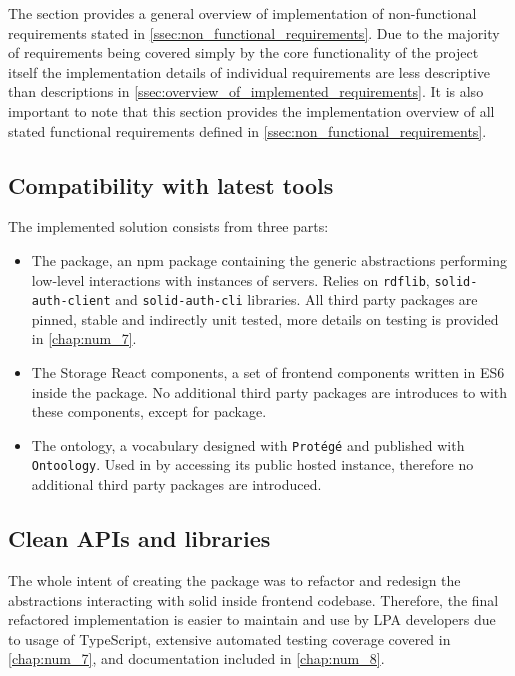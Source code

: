 The section provides a general overview of implementation of non-functional requirements stated in \autoref{ssec:non_functional_requirements}. Due to the majority of requirements being covered simply by the core functionality of the \solid{} project itself the implementation details of individual requirements are less descriptive than descriptions in \autoref{ssec:overview_of_implemented_requirements}. It is also important to note that this section provides the implementation overview of all stated functional requirements defined in \autoref{ssec:non_functional_requirements}.

\subsection{Compatibility with latest tools}

The implemented solution consists from three parts:
\begin{itemize}
    \item The \lpas{} package, an npm package containing the generic abstractions performing low-level interactions with instances of \solid{} servers. Relies on \texttt{rdflib}, \texttt{solid-auth-client} and \texttt{solid-auth-cli} libraries. All third party packages are pinned, stable and indirectly unit tested, more details on testing is provided in \autoref{chap:num_7}. 
    \item The Storage React components, a set of frontend components written in ES6 inside the \lpa{} package. No additional third party packages are introduces to \lpa{} with these components, except for \lpas{} package. 
    \item The \lpas{} ontology, a vocabulary designed with \texttt{Protégé} and published with \texttt{Ontoology}. Used in \lpa{} by accessing its public hosted instance, therefore no additional third party packages are introduced.
\end{itemize}

\subsection{Clean APIs and libraries}

The whole intent of creating the \lpas{} package was to refactor and redesign the abstractions interacting with solid inside \lpa{} frontend codebase. Therefore, the final refactored implementation is easier to maintain and use by LPA developers due to usage of TypeScript, extensive automated testing coverage covered in \autoref{chap:num_7}, and documentation included in \autoref{chap:num_8}.


